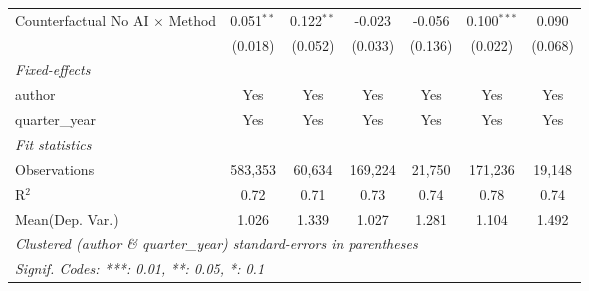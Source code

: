 \begin{tabular}{lcccccc}
   Counterfactual No AI $\times$ Method  & 0.051$^{**}$   & 0.122$^{**}$  & -0.023         & -0.056        & 0.100$^{***}$  & 0.090\\   
                                         & (0.018)        & (0.052)       & (0.033)        & (0.136)       & (0.022)        & (0.068)\\   
   \midrule
   \emph{Fixed-effects}\\
   author                                & Yes            & Yes           & Yes            & Yes           & Yes            & Yes\\  
   quarter\_year                         & Yes            & Yes           & Yes            & Yes           & Yes            & Yes\\  
   \midrule
   \emph{Fit statistics}\\
   Observations                          & 583,353        & 60,634        & 169,224        & 21,750        & 171,236        & 19,148\\  
   R$^2$                                 & 0.72           & 0.71          & 0.73           & 0.74          & 0.78           & 0.74\\  
Mean(Dep. Var.) & 1.026 & 1.339 & 1.027 & 1.281 & 1.104 & 1.492 \\
   \midrule \midrule
   \multicolumn{7}{l}{\emph{Clustered (author \& quarter\_year) standard-errors in parentheses}}\\
   \multicolumn{7}{l}{\emph{Signif. Codes: ***: 0.01, **: 0.05, *: 0.1}}\\
\end{tabular}
\par\endgroup

